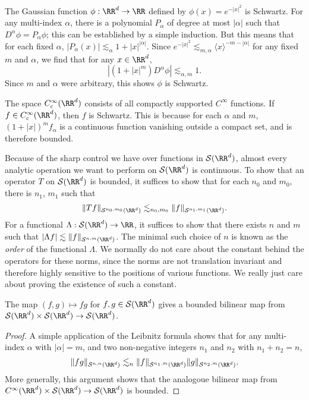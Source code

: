 \begin{example}
    The Gaussian function $\phi: \RR^d \to \RR$ defined by $\phi(x) = e^{-|x|^2}$ is Schwartz. For any multi-index $\alpha$, there is a polynomial $P_\alpha$ of degree at most $|\alpha|$ such that $D^\alpha \phi = P_\alpha \phi$; this can be established by a simple induction. But this means that for each fixed $\alpha$, $|P_\alpha(x)| \lesssim_\alpha 1 + |x|^{|\alpha|}$. Since $e^{-|x|^2} \lesssim_{m,\alpha} \langle x \rangle^{-m -|\alpha|}$ for any fixed $m$ and $\alpha$, we find that for any $x \in \RR^d$,
    \[ | (1 + |x|^m) D^\alpha \phi| \lesssim_{\alpha,m} 1. \]
    Since $m$ and $\alpha$ were arbitrary, this shows $\phi$ is Schwartz.
\end{example}

\begin{example}
    The space $C^\infty_c(\RR^d)$ consists of all compactly supported $C^\infty$ functions. If $f \in C^\infty_c(\RR^d)$, then $f$ is Schwartz. This is because for each $\alpha$ and $m$, $(1 + |x|)^m f_\alpha$ is a continuous function vanishing outside a compact set, and is therefore bounded.
\end{example} 

Because of the sharp control we have over functions in $\mathcal{S}(\RR^d)$, almost every analytic operation we want to perform on $\mathcal{S}(\RR^d)$ is continuous. To show that an operator $T$ on $\mathcal{S}(\RR^d)$ is bounded, it suffices to show that for each $n_0$ and $m_0$, there is $n_1$, $m_1$ such that
%
\[ \| Tf \|_{\mathcal{S}^{n_0,m_0}(\RR^d)} \lesssim_{n_0,m_0} \| f \|_{\mathcal{S}^{n_1,m_1}(\RR^d)}. \]
%
For a functional $\Lambda: \mathcal{S}(\RR^d) \to \RR$, it suffices to show that there exists $n$ and $m$ such that $|\Lambda f| \lesssim \| f \|_{\mathcal{S}^{n,m}(\RR^d)}$. The minimal such choice of $n$ is known as the \emph{order} of the functional $\Lambda$. We normally do not care about the constant behind the operators for these norms, since the norms are not translation invariant and therefore highly sensitive to the positions of various functions. We really just care about proving the existence of such a constant.

\begin{lemma}
  The map $(f,g) \mapsto fg$ for $f,g \in \mathcal{S}(\RR^d)$ gives a bounded bilinear map from $\mathcal{S}(\RR^d) \times \mathcal{S}(\RR^d) \to \mathcal{S}(\RR^d)$.
\end{lemma}
\begin{proof}
  A simple application of the Leibnitz formula shows that for any multi-index $\alpha$ with $|\alpha| = m$, and two non-negative integers $n_1$ and $n_2$ with $n_1 + n_2 = n$,
  \[ \| fg \|_{\mathcal{S}^{n,\alpha}(\RR^d)} \lesssim_n \| f \|_{\mathcal{S}^{n_1,m}(\RR^d)} \| g \|_{\mathcal{S}^{n_2,m}(\RR^d)}. \]
  More generally, this argument shows that the analogoue bilinear map from $C^\infty(\RR^d) \times \mathcal{S}(\RR^d) \to \mathcal{S}(\RR^d)$ is bounded.
\end{proof}

